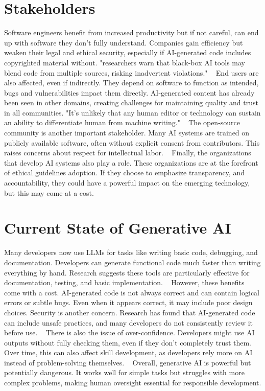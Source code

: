 \documentclass[sigconf, 12pt]{acmart}
\begin{document}
\section{Stakeholders}
Software engineers benefit from increased productivity but if not careful, can end up with software they don't fully understand.
Companies gain efficiency but weaken their legal and ethical security, especially if AI-generated code includes copyrighted material without. "researchers warn that black-box AI tools may blend code from multiple sources, risking inadvertent violations." ~\cite{(9)}
End users are also affected, even if indirectly. They depend on software to function as intended, bugs and vulnerabilities impact them directly. AI-generated content has already been seen in other domains, creating challenges for maintaining quality and trust in all communities. "It’s unlikely that any human editor or technology can sustain an ability to differentiate human from machine writing." ~\cite{(10)}
The open-source community is another important stakeholder. Many AI systems are trained on publicly available software, often without explicit consent from contributors. This raises concerns about respect for intellectual labor. ~\cite{(7)}
Finally, the organizations that develop AI systems also play a role. These organizations are at the forefront of ethical guidelines adoption. If they choose to emphasize transparency, and accountability, they could have a powerful impact on the emerging technology, but this may come at a cost. ~\cite{(4)} ~\cite{(8)}

\section{Current State of Generative AI}
Many developers now use LLMs for tasks like writing basic code, debugging, and documentation. Developers can generate functional code much faster than writing everything by hand. Research suggests these tools are particularly effective for documentation, testing, and basic implementation. ~\cite{(6)}
However, these benefits come with a cost. AI-generated code is not always correct and can contain logical errors or subtle bugs. Even when it appears correct, it may include poor design choices. Security is another concern. Research has found that AI-generated code can include unsafe practices, and many developers do not consistently review it before use. ~\cite{(6)} 
There is also the issue of over-confidence. Developers might use AI outputs without fully checking them, even if they don’t completely trust them. Over time, this can also affect skill development, as developers rely more on AI instead of problem-solving themselves. ~\cite{(6)}
Overall, generative AI is powerful but potentially dangerous. It works well for simple tasks but struggles with more complex problems, making human oversight essential for responsible development.
\end{document}
